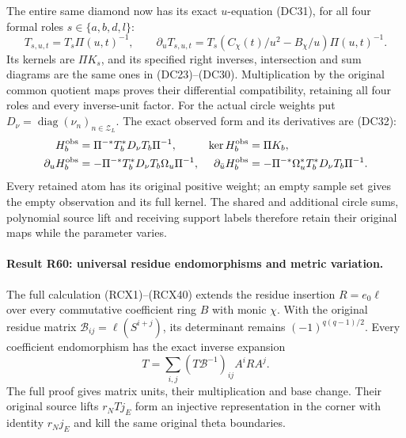 The entire same diamond now has its exact \(u\)-equation
(DC31), for all four formal roles \(s\in\{a,b,d,l\}\):
\[
 T_{s,u,t}=T_s\Pi(u,t)^{-1},\qquad
 \partial_uT_{s,u,t}
   =T_s(C_\chi(t)/u^2-B_\chi/u)\Pi(u,t)^{-1}.
\]
Its kernels are \(\Pi K_s\), and its specified right
inverses, intersection and sum diagrams are the same ones
in (DC23)--(DC30).  Multiplication by the original common
quotient maps proves their differential compatibility,
retaining all four roles and every inverse-unit factor.
For the actual circle weights put
\(D_\nu=\operatorname{diag}(\nu_n)_{n\in\mathcal Z_L}\).
The exact observed form and its derivatives are (DC32):
\[
 \begin{aligned}
 H_b^{\rm obs}&=\Pi^{-*}T_b^*D_\nu T_b\Pi^{-1},
 &\ker H_b^{\rm obs}&=\Pi K_b,\\
 \partial_uH_b^{\rm obs}
   &=-\Pi^{-*}T_b^*D_\nu T_b\Omega_u\Pi^{-1},&
 \partial_{\bar u}H_b^{\rm obs}
   &=-\Pi^{-*}\Omega_u^*T_b^*D_\nu T_b\Pi^{-1}.
 \end{aligned}
\]
Every retained atom has its original positive weight; an
empty sample set gives the empty observation and its full
kernel.  The shared and additional circle sums, polynomial
source lift and receiving support labels therefore retain
their original maps while the parameter varies.

\paragraph{Result R60: universal residue endomorphisms and metric variation.}
The full calculation (RCX1)--(RCX40) extends the residue insertion
$R=e_0\ell$ over every commutative coefficient ring $B$ with monic
$\chi$. With the original residue matrix
$\mathcal B_{ij}=\ell(S^{i+j})$, its determinant remains
$(-1)^{q(q-1)/2}$. Every coefficient endomorphism has the exact inverse
expansion
\[
 T=\sum_{i,j}(T\mathcal B^{-1})_{ij}A^iRA^j.
\]
The full proof gives matrix units, their multiplication and base
change. Their original source lifts $r_NTj_E$ form an injective
representation in the corner with identity $r_Nj_E$ and kill the
same original theta boundaries.

